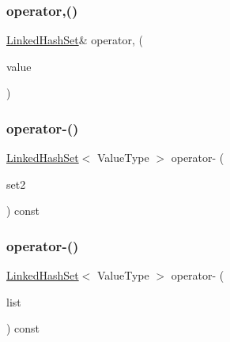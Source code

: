 \mbox{\label{classLinkedHashSet_a9e7cf91d4c12f981ef44ea2c6979eadb}} 
\subsubsection{\texorpdfstring{operator,()}{operator,()}}
{\footnotesize\ttfamily \mbox{\hyperlink{classLinkedHashSet}{Linked\+Hash\+Set}}\& operator, (\begin{DoxyParamCaption}\item[{const Value\+Type \&}]{value }\end{DoxyParamCaption})\hspace{0.3cm}{\ttfamily [inline]}}

\mbox{\label{classLinkedHashSet_afc3bf1d0289d3294f2d8e3eaad1633ee}} 
\subsubsection{\texorpdfstring{operator-\/()}{operator-()}\hspace{0.1cm}{\footnotesize\ttfamily [1/3]}}
{\footnotesize\ttfamily \mbox{\hyperlink{classLinkedHashSet}{Linked\+Hash\+Set}}$<$ Value\+Type $>$ operator-\/ (\begin{DoxyParamCaption}\item[{const \mbox{\hyperlink{classLinkedHashSet}{Linked\+Hash\+Set}}$<$ Value\+Type $>$ \&}]{set2 }\end{DoxyParamCaption}) const}

\mbox{\label{classLinkedHashSet_a06be555059cfd07aa33d59f0bfed472e}} 
\subsubsection{\texorpdfstring{operator-\/()}{operator-()}\hspace{0.1cm}{\footnotesize\ttfamily [2/3]}}
{\footnotesize\ttfamily \mbox{\hyperlink{classLinkedHashSet}{Linked\+Hash\+Set}}$<$ Value\+Type $>$ operator-\/ (\begin{DoxyParamCaption}\item[{std\+::initializer\+\_\+list$<$ Value\+Type $>$}]{list }\end{DoxyParamCaption}) const}

